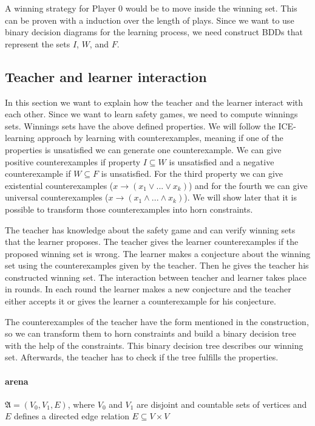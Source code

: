 \documentclass[10pt,a4paper]{article}
\theoremstyle{plain}
\theoremstyle{definition}
\begin{document}
A winning strategy for Player 0 would be to move inside the winning set. This can be proven with a induction over the length of plays. Since we want to use binary decision diagrams for the learning process, we need construct BDDs that represent the sets $I$, $W$, and $F$.  

\subsection{Teacher and learner interaction}

In this section we want to explain how the teacher and the learner interact with each other.
Since we want to learn safety games, we need to compute winnings sets. Winnings sets have the above defined properties. We will follow the ICE-learning approach by learning with counterexamples, meaning if one of the properties is unsatisfied we can generate one counterexample. We can give positive counterexamples if property $I \subseteq W$ is unsatisfied and a negative counterexample if $W \subseteq F$ is unsatisfied.
For the third property we can give existential counterexamples ($ x \to (x_1 \vee  ... \vee x_k)$) and for the fourth we can give universal counterexamples ($ x\to (x_1 \wedge ... \wedge x_k)$). We will show later that it is possible to transform those counterexamples into horn constraints.

The teacher has knowledge about the safety game and can verify winning sets that the learner proposes. The teacher gives the learner counterexamples if the proposed winning set is wrong. 
The learner makes a conjecture about the winning set using the counterexamples given by the teacher. Then he gives the teacher his constructed winning set.
The interaction between teacher and learner takes place in rounds. In each round the learner makes a new conjecture and the teacher either accepts it or gives the learner a counterexample for his conjecture.

The counterexamples of the teacher have the form mentioned in the construction, so we can transform them to horn constraints and build a binary decision tree with the help of the constraints. This binary decision tree describes our winning set. Afterwards, the teacher has to check if the tree fulfills the properties.


\paragraph*{arena} $\mathfrak{A} = (V_{0}, V_{1}, E)$, where $V_{0}$ and $V_{1}$ are disjoint and countable sets of vertices and $E$ defines a directed edge relation $E \subseteq V \times V$
\end{document}
